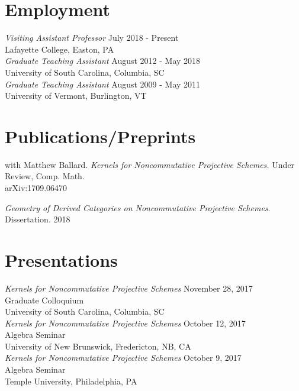 \documentclass{article}
\begin{document}
\section*{Employment}
\textsl{Visiting Assistant Professor} \hfill July 2018 - Present\\
Lafayette College, Easton, PA\\

\noindent \textsl{Graduate Teaching Assistant} \hfill August 2012 - May 2018 \\
University of South Carolina, Columbia, SC\\

\noindent\textsl{Graduate Teaching Assistant} \hfill August 2009 - May 2011 \\
University of Vermont, Burlington, VT\\


\newpage

\section*{Publications/Preprints}
with Matthew Ballard.  \textsl{Kernels for Noncommutative Projective Schemes.} 
\hfill Under Review, Comp. Math.\\
arXiv:1709.06470

\noindent\textsl{Geometry of Derived Categories on Noncommutative Projective Schemes}. Dissertation. \hfill 2018\\

\section*{Presentations}
\textsl{Kernels for Noncommutative Projective Schemes} \hfill November 28, 2017\\
Graduate Colloquium\\
University of South Carolina, Columbia, SC\\

\noindent\textsl{Kernels for Noncommutative Projective Schemes} \hfill October 12, 2017\\
Algebra Seminar\\
University of New Brunswick, Fredericton, NB, CA\\

\noindent\textsl{Kernels for Noncommutative Projective Schemes} \hfill October 9, 2017\\
Algebra Seminar\\
Temple University, Philadelphia, PA\\
\end{document}
